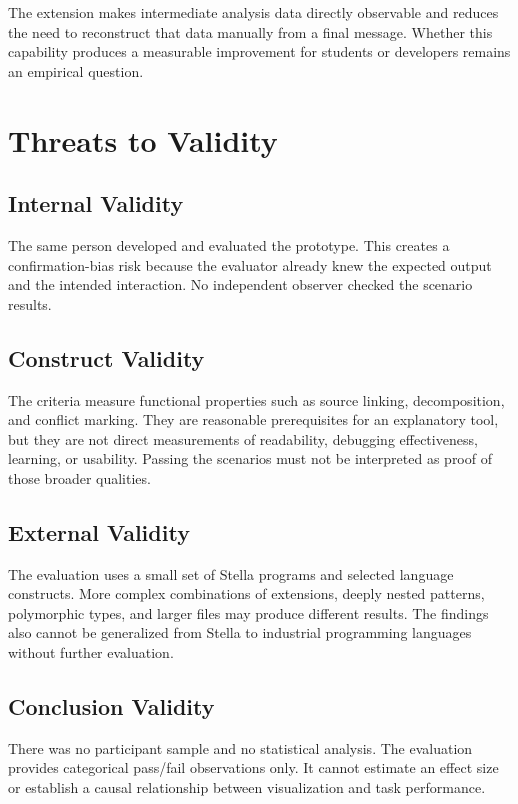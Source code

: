 The extension makes intermediate analysis data directly observable and reduces the need to reconstruct that data manually from a final message. Whether this capability produces a measurable improvement for students or developers remains an empirical question.

\section{Threats to Validity}

\subsection{Internal Validity}

The same person developed and evaluated the prototype. This creates a confirmation-bias risk because the evaluator already knew the expected output and the intended interaction. No independent observer checked the scenario results.

\subsection{Construct Validity}

The criteria measure functional properties such as source linking, decomposition, and conflict marking. They are reasonable prerequisites for an explanatory tool, but they are not direct measurements of readability, debugging effectiveness, learning, or usability. Passing the scenarios must not be interpreted as proof of those broader qualities.

\subsection{External Validity}

The evaluation uses a small set of Stella programs and selected language constructs. More complex combinations of extensions, deeply nested patterns, polymorphic types, and larger files may produce different results. The findings also cannot be generalized from Stella to industrial programming languages without further evaluation.

\subsection{Conclusion Validity}

There was no participant sample and no statistical analysis. The evaluation provides categorical pass/fail observations only. It cannot estimate an effect size or establish a causal relationship between visualization and task performance.

